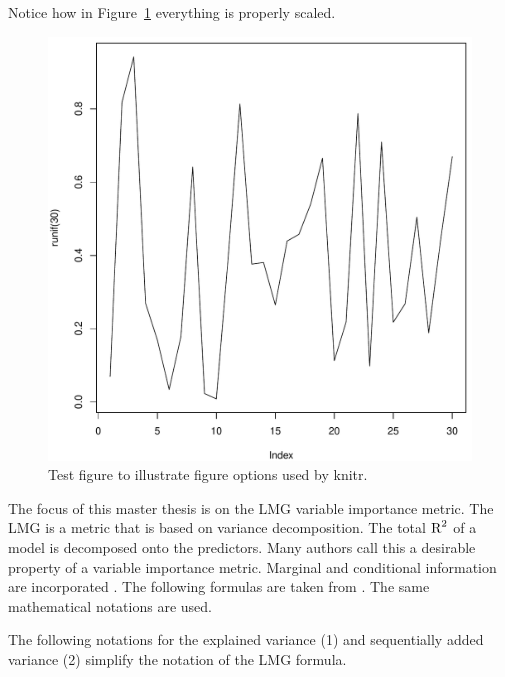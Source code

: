\documentclass[11pt,a4paper,twoside]{book}\usepackage[]{graphicx}\usepackage[]{color}
\newenvironment{knitrout}{}{} %
\begin{document}
\bigskip 

Notice how in Figure~\ref{f02:1} everything is properly scaled.   

\begin{figure}
\begin{knitrout}
\color{fgcolor}

{\centering \includegraphics[width=\textwidth-3cm]{figure/ch02_figunnamed-chunk-3-1} 

}



\end{knitrout}
  \caption{Test figure to illustrate figure options used by knitr.}
  \label{f02:1}
\end{figure}


The focus of this master thesis is on the LMG variable importance metric. The LMG is a metric that is based on variance decomposition. The total $\text{R}^2$ of a model is decomposed onto the predictors. Many authors call this a desirable property of a variable importance metric. Marginal and conditional information are incorporated \citep{Gromping2015} .  The following formulas are taken from \cite{Gromping2015}. The same mathematical notations are used. 

The following  notations for the explained variance (1) and sequentially added variance (2) simplify the notation of the LMG formula. 
\end{document}
